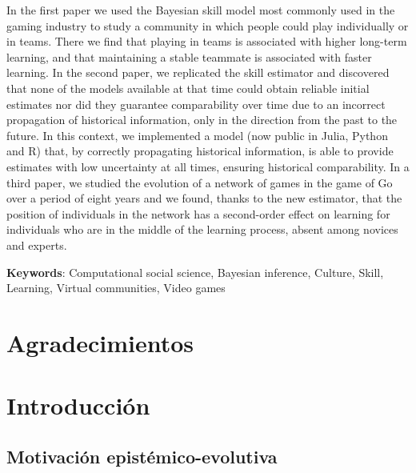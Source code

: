 \documentclass[a4paper,11pt]{book}
\makeatletter
\renewcommand{\mainmatter}{\cleardoublepage\@mainmattertrue}
\theoremstyle{definition}
\makeatother
\begin{document}

In the first paper we used the Bayesian skill model most commonly used in the gaming industry to study a community in which people could play individually or in teams.
There we find that playing in teams is associated with higher long-term learning, and that maintaining a stable teammate is associated with faster learning.
In the second paper, we replicated the skill estimator and discovered that none of the models available at that time could obtain reliable initial estimates nor did they guarantee comparability over time due to an incorrect propagation of historical information, only in the direction from the past to the future.
In this context, we implemented a model (now public in Julia, Python and R) that, by correctly propagating historical information, is able to provide estimates with low uncertainty at all times, ensuring historical comparability.
In a third paper, we studied the evolution of a network of games in the game of Go over a period of eight years and we found, thanks to the new estimator, that the position of individuals in the network has a second-order effect on learning for individuals who are in the middle of the learning process, absent among novices and experts.
%
\vspace{0.1cm}

\noindent \textbf{Keywords}: Computational social science, Bayesian inference, Culture, Skill, Learning, Virtual communities, Video games

\normalsize

\tableofcontents

\newpage

\vfill


\normalsize

\chapter{Agradecimientos}


\mainmatter


\chapter{Introducci\'on} \label{ch:evo}


\section{Motivación epistémico-evolutiva}
\end{document}

